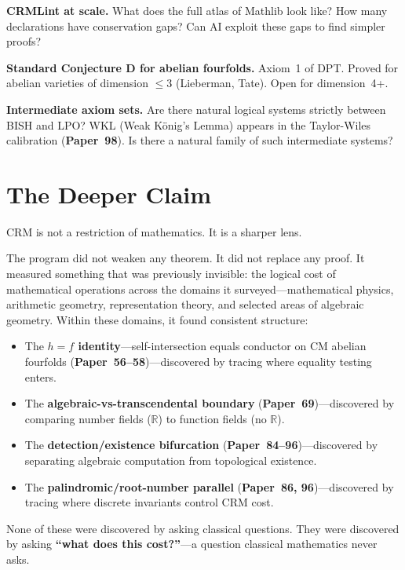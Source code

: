 \documentclass[11pt,twoside,openany]{report}
\theoremstyle{remark}
\newcommand{\BISH}{\textsf{BISH}}
\newcommand{\paperref}[1]{\textbf{Paper~#1}}
\begin{document}
\textbf{CRMLint at scale.} What does the full atlas of Mathlib look like? How many declarations have conservation gaps? Can AI exploit these gaps to find simpler proofs?

\textbf{Standard Conjecture D for abelian fourfolds.} Axiom~1 of DPT. Proved for abelian varieties of dimension $\leq 3$ (Lieberman, Tate). Open for dimension~4+.

\textbf{Intermediate axiom sets.} Are there natural logical systems strictly between \BISH{} and LPO? WKL (Weak K\"onig's Lemma) appears in the Taylor-Wiles calibration (\paperref{98}). Is there a natural family of such intermediate systems?


\section{The Deeper Claim}

CRM is not a restriction of mathematics. It is a sharper lens.

The program did not weaken any theorem. It did not replace any proof. It measured something that was previously invisible: the logical cost of mathematical operations across the domains it surveyed---mathematical physics, arithmetic geometry, representation theory, and selected areas of algebraic geometry. Within these domains, it found consistent structure:

\begin{itemize}
  \item The \textbf{$h = f$ identity}---self-intersection equals conductor on CM abelian fourfolds (\paperref{56--58})---discovered by tracing where equality testing enters.
  \item The \textbf{algebraic-vs-transcendental boundary} (\paperref{69})---discovered by comparing number fields ($\mathbb{R}$) to function fields (no $\mathbb{R}$).
  \item The \textbf{detection/existence bifurcation} (\paperref{84--96})---discovered by separating algebraic computation from topological existence.
  \item The \textbf{palindromic/root-number parallel} (\paperref{86, 96})---discovered by tracing where discrete invariants control CRM cost.
\end{itemize}

None of these were discovered by asking classical questions. They were discovered by asking \textbf{``what does this cost?''}---a question classical mathematics never asks.
\end{document}
